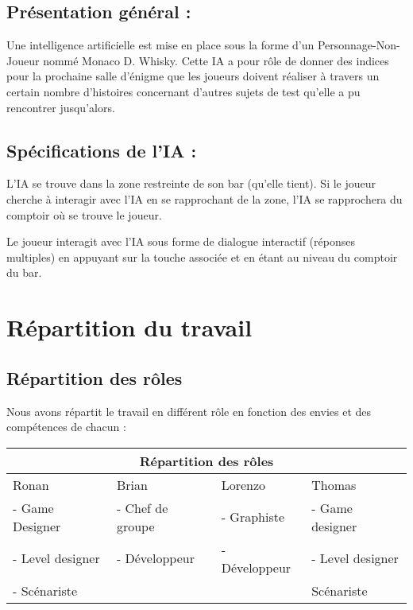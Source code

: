 \documentclass[a4paper,11pt]{article}
\begin{document}
\subsection{Présentation général :}

Une intelligence artificielle est mise en place sous la 
forme d’un Personnage-Non-Joueur nommé Monaco D. Whisky. 
Cette IA a pour rôle de donner des indices pour la prochaine salle d’énigme que les 
joueurs doivent réaliser à travers un certain nombre d’histoires concernant d’autres sujets de 
test qu’elle a pu rencontrer jusqu’alors.


\subsection{Spécifications de l’IA :}

L’IA se trouve dans la zone restreinte de son bar (qu’elle tient). Si le joueur cherche à 
interagir avec l’IA en se rapprochant de la zone, l’IA se rapprochera du comptoir où se trouve le joueur.\newline

Le joueur interagit avec l’IA sous forme de dialogue interactif (réponses multiples) 
en appuyant sur la touche associée et en étant au niveau du comptoir du bar.


\section{Répartition du travail}

\subsection{Répartition des rôles}

Nous avons répartit le travail en différent rôle en fonction des envies 
et des compétences de chacun :\newline

\begin{tabular}{ |p{3cm}|p{3cm}|p{3cm}|p{3cm}|  }
    \hline
    \multicolumn{4}{|c|}{Répartition des rôles} \\
    \hline
     Ronan & Brian & Lorenzo & Thomas\\
    \hline
     - Game Designer & - Chef de groupe & - Graphiste & - Game designer\\
     - Level designer & - Développeur & - Développeur & - Level designer\\
     - Scénariste & & & Scénariste\\
    \hline
\end{tabular}
\break
\newline
\end{document}
